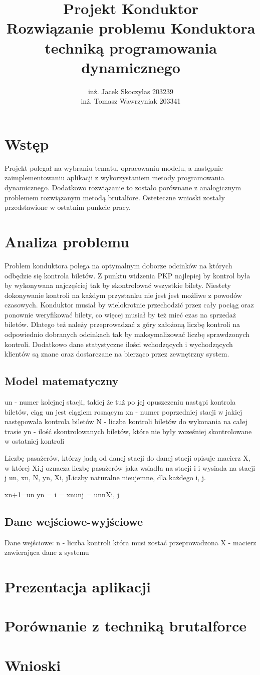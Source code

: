 \documentclass[hidelinks,12pt]{article}
\author{inż. Jacek Skoczylas 203239 \\inż. Tomasz Wawrzyniak 203341}
\title{Projekt Konduktor\\
Rozwiązanie problemu Konduktora techniką programowania dynamicznego}
\numberwithin{figure}{section} %
\numberwithin{equation}{section} %
\numberwithin{table}{section} %
\begin{document}
\maketitle
\newpage
\tableofcontents
\newpage

\section{Wstęp}
Projekt polegał na wybraniu tematu, opracowaniu modelu, a następnie zaimplementowaniu aplikacji z wykorzystaniem metody programowania dynamicznego.
Dodatkowo rozwiązanie to zostało porównane z analogicznym problemem rozwiązanym metodą brutalfore. Osteteczne wnioski zostały przedstawione w ostatnim punkcie pracy.

\section{Analiza problemu}
Problem konduktora polega na optymalnym doborze odcinków na których odbędzie się kontrola biletów. Z punktu widzenia PKP najlepiej by kontrol była by wykonywana najczęściej tak by skontrolować wszystkie bilety. Niestety dokonywanie kontroli na każdym przystanku nie jest jest możliwe z powodów czasowych. Konduktor musiał by wielokrotnie przechodzić przez cały pociąg oraz ponownie weryfikować bilety, co więcej musiał by też mieć czas na sprzedaż biletów. Dlatego też należy przeprowadzać z góry założoną liczbę kontroli na odpowiednio dobranych odcinkach  tak by maksymalizować liczbę sprawdzonych kontroli. Dodatkowo dane statystyczne ilości wchodzących i wychodzących klientów są znane oraz dostarczane na bierząco przez zewnętrzny system.

\subsection{Model matematyczny}
un - numer kolejnej stacji, takiej że tuż po jej opuszczeniu nastąpi kontrola biletów, ciąg un jest ciągiem rosnącym
xn - numer poprzedniej stacji w jakiej następowała kontrola biletów
N - liczba kontroli biletów do wykonania na całej trasie
yn - ilość skontrolowanych biletów, które nie były wcześniej skontrolowane w ostatniej kontroli

Liczbę pasażerów, którzy jadą od danej stacji do danej stacji opisuje macierz X, w której Xi,j oznacza liczbę pasażerów jaka wsiadła na stacji i i wysiada na stacji j
un, xn, N, yn, Xi, jLiczby naturalne nieujemne, dla każdego i, j.

xn+1=un
yn = i = xnunj = unnXi, j


\subsection{Dane wejściowe-wyjściowe}
Dane wejściowe:
n - liczba kontroli która musi zostać przeprowadzona
X - macierz zawierająca dane z systemu

\section{Prezentacja aplikacji}


\section{Porównanie z techniką brutalforce}

\section{Wnioski}
\end{document}
